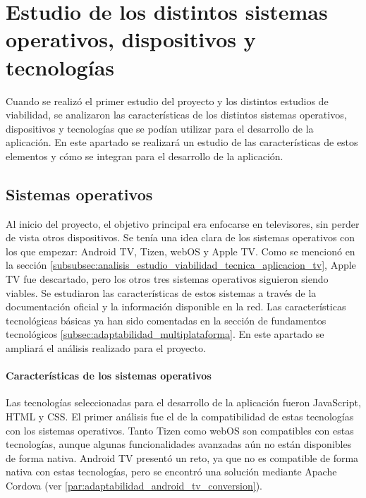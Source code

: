 \section{Estudio de los distintos sistemas operativos, dispositivos y tecnologías}
\label{sec:analisis_estudio}

Cuando se realizó el primer estudio del proyecto y los distintos estudios de viabilidad, se analizaron las 
características de los distintos sistemas operativos, dispositivos y tecnologías que se podían utilizar para
el desarrollo de la aplicación. En este apartado se realizará un estudio de las características de estos 
elementos y cómo se integran para el desarrollo de la aplicación.

\subsection{Sistemas operativos}
\label{subsec:analisis_estudio_sistemas_operativos}

Al inicio del proyecto, el objetivo principal era enfocarse en televisores, sin perder de vista otros dispositivos. 
Se tenía una idea clara de los sistemas operativos con los que empezar: Android TV, Tizen, webOS y Apple TV. Como 
se mencionó en la sección \ref{subsubsec:analisis_estudio_viabilidad_tecnica_aplicacion_tv}, Apple TV fue descartado, 
pero los otros tres sistemas operativos siguieron siendo viables. Se estudiaron las características de estos sistemas 
a través de la documentación oficial y la información disponible en la red. Las características tecnológicas básicas ya 
han sido comentadas en la sección de fundamentos tecnológicos \ref{subsec:adaptabilidad_multiplataforma}. En este apartado 
se ampliará el análisis realizado para el proyecto.

\paragraph{Características de los sistemas operativos}
\label{par:analisis_estudio_sistemas_operativos_caracteristicas}
Las tecnologías seleccionadas para el desarrollo de la aplicación fueron JavaScript, HTML y CSS. El primer análisis fue 
el de la compatibilidad de estas tecnologías con los sistemas operativos. Tanto Tizen como webOS son compatibles con estas tecnologías, 
aunque algunas funcionalidades avanzadas aún no están disponibles de forma nativa. Android TV presentó un reto, ya que no es compatible 
de forma nativa con estas tecnologías, pero se encontró una solución mediante Apache Cordova (ver \ref{par:adaptabilidad_android_tv_conversion}).

